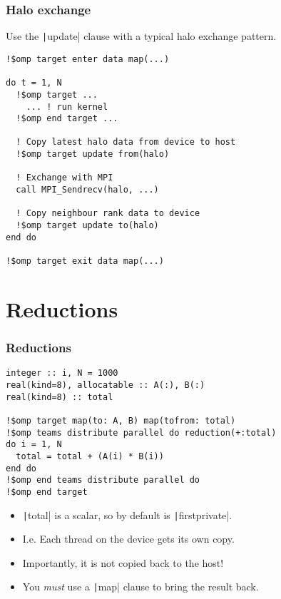 \documentclass{beamer}
\begin{document}
\begin{frame}[fragile]
\frametitle{Halo exchange}
Use the \texttt|update| clause with a typical halo exchange pattern.

\begin{verbatim}
!$omp target enter data map(...)

do t = 1, N
  !$omp target ...
    ... ! run kernel
  !$omp end target ...

  ! Copy latest halo data from device to host
  !$omp target update from(halo)

  ! Exchange with MPI
  call MPI_Sendrecv(halo, ...)

  ! Copy neighbour rank data to device
  !$omp target update to(halo)
end do

!$omp target exit data map(...)
\end{verbatim}

\end{frame}

\section{Reductions}
\begin{frame}[fragile]
\frametitle{Reductions}
\begin{verbatim}
integer :: i, N = 1000
real(kind=8), allocatable :: A(:), B(:)
real(kind=8) :: total

!$omp target map(to: A, B) map(tofrom: total)
!$omp teams distribute parallel do reduction(+:total)
do i = 1, N
  total = total + (A(i) * B(i))
end do
!$omp end teams distribute parallel do
!$omp end target
\end{verbatim}

\begin{itemize}
  \item \texttt|total| is a scalar, so by default is \texttt|firstprivate|.
  \item I.e. Each thread on the device gets its own copy.
  \item Importantly, it is not copied back to the host!
  \item You \emph{must} use a \texttt|map| clause to bring the result back.
\end{itemize}

\end{frame}
\end{document}
